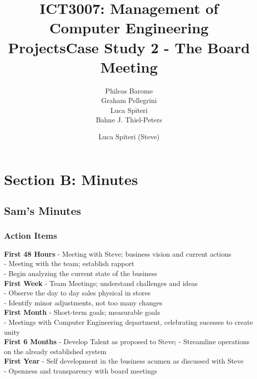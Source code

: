 \documentclass[a4paper,10pt]{article}
\title{ICT3007: Management of Computer Engineering Projects\newline \centering Case Study 2 - The Board Meeting}
\author{
Phileas Barome\\
Graham Pellegrini\\
Luca Spiteri\\
Bahne J. Thiel-Peters\\
}
\begin{document}
\maketitle
\thispagestyle{empty}

\setcounter{page}{1}

\section{Section B: Minutes}

\subsection{Sam's Minutes}
\author{Luca Spiteri (Steve)}

\subsubsection{Action Items}
\textbf{First 48 Hours}
- Meeting with Steve; business vision and current actions \\
- Meeting with the team; establish rapport \\
- Begin analyzing the current state of the business \\

\textbf{First Week}
- Team Meetings; understand challenges and ideas \\
- Observe the day to day sales physical in stores \\
- Identify minor adjustments, not too many changes \\

\textbf{First Month}
- Short-term goals; measurable goals \\
- Meetings with Computer Engineering department, celebrating sucesses to create unity \\

\textbf{First 6 Months}
- Develop Talent as proposed to Steve;
- Streamline operations on the already established system \\

\textbf{First Year}
- Self development in the business acumen as discussed with Steve \\
- Openness and transparency with board meetings \\
\end{document}
